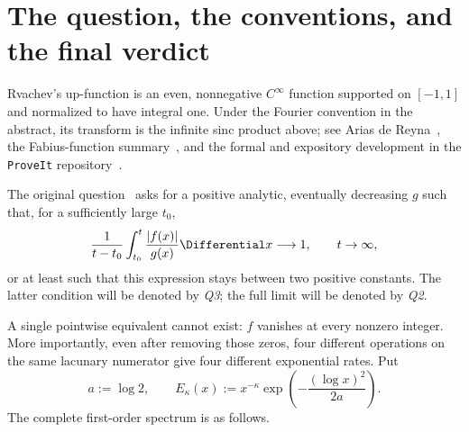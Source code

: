 \documentclass[11pt,oneside]{article}
\theoremstyle{definition}
\theoremstyle{remark}
\newcommand{\LambertW}{W}
\begin{document}
\begin{abstract}
For almost every fixed dyadic ray the centered logarithm satisfies a CLT and a
two-sided law of the iterated logarithm with asymptotic variance $\pi^2/4$ per
dyadic step.  This corrects a factor $2$ in the variance calculation in the
Aistleitner--Hofer--Larcher source: the sharp coefficient in front of
$\sqrt{n\log\log n}$ is $\pi/\sqrt2$, not $\pi$.

Finally, if
$M_k=\max_{2^k\le x\le2^{k+1}}|f(x)|$, put
$a=\log2$, $\beta=\log(\sqrt3/2)$,
$c=(a/\pi)\sqrt{3/2}$, and $n=k+1$.  Then
\[
 \log M_k=
 -\frac a2k(k+1)-n\log\pi+n\beta
 -\frac{\LambertW(cn)^2+2\LambertW(cn)}{2a}
 +\BigO((\log\log k)^2).
\]
Thus the true annular envelope contains a second log-normal suppression in
$\log\log x$, not a fixed power of $\log x$.  Individual interzero peaks are
still more irregular: immediately after $m2^k$, with $m$ fixed and odd, they
obey an explicit much smaller two-adic asymptotic.  Together these results give
a single consistent resolution of all supplied materials.
\end{abstract}

\tableofcontents
\newpage

\section{The question, the conventions, and the final verdict}
\label{sec:intro}

Rvachev's up-function is an even, nonnegative $C^\infty$ function supported on
$[-1,1]$ and normalized to have integral one.  Under the Fourier convention in
the abstract, its transform is the infinite sinc product above; see
Arias de Reyna~\cite{arias1982}, the Fabius-function summary~\cite{wikipedia},
and the formal and expository development in the \texttt{ProveIt}
repository~\cite{proveit}.

The original question~\cite{mse-source} asks for a positive analytic,
eventually decreasing $g$ such that, for a sufficiently large $t_0$,
\begin{equation}
 \frac1{t-t_0}\int_{t_0}^{t}\frac{|f(x)|}{g(x)}\Differential x
 \longrightarrow1,
 \qquad t\to\infty,
 \label{eq:Q2}
\end{equation}
or at least such that this expression stays between two positive constants.
The latter condition will be denoted by \emph{Q3}; the full limit will be
denoted by \emph{Q2}.

A single pointwise equivalent cannot exist: $f$ vanishes at every nonzero
integer.  More importantly, even after removing those zeros, four different
operations on the same lacunary numerator give four different exponential
rates.  Put
\begin{equation}
 a:=\log2,
 \qquad
 E_\kappa(x):=x^{-\kappa}\exp\!\left(-\frac{(\log x)^2}{2a}\right).
 \label{eq:E-kappa}
\end{equation}
The complete first-order spectrum is as follows.
\end{document}

